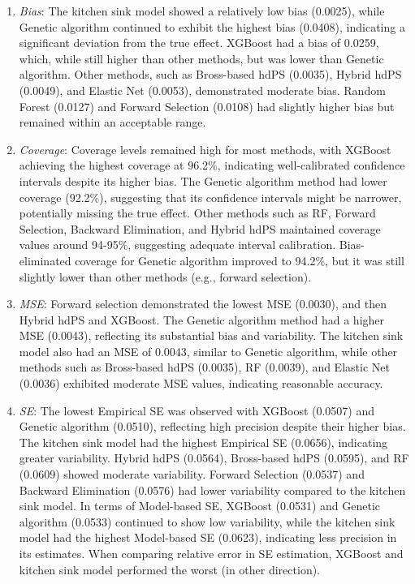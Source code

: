 \documentclass[10pt,letterpaper]{article}
\begin{document}
\begin{enumerate}
\def\labelenumi{\arabic{enumi}.}
\item
  \emph{Bias}: The kitchen sink model showed a relatively low bias
  (0.0025), while Genetic algorithm continued to exhibit the highest
  bias (0.0408), indicating a significant deviation from the true
  effect. XGBoost had a bias of 0.0259, which, while still higher than
  other methods, but was lower than Genetic algorithm. Other methods,
  such as Bross-based hdPS (0.0035), Hybrid hdPS (0.0049), and Elastic
  Net (0.0053), demonstrated moderate bias. Random Forest (0.0127) and
  Forward Selection (0.0108) had slightly higher bias but remained
  within an acceptable range.
\item
  \emph{Coverage}: Coverage levels remained high for most methods, with
  XGBoost achieving the highest coverage at 96.2\%, indicating
  well-calibrated confidence intervals despite its higher bias. The
  Genetic algorithm method had lower coverage (92.2\%), suggesting that
  its confidence intervals might be narrower, potentially missing the
  true effect. Other methods such as RF, Forward Selection, Backward
  Elimination, and Hybrid hdPS maintained coverage values around
  94-95\%, suggesting adequate interval calibration. Bias-eliminated
  coverage for Genetic algorithm improved to 94.2\%, but it was still
  slightly lower than other methods (e.g., forward selection).
\item
  \emph{MSE}: Forward selection demonstrated the lowest MSE (0.0030),
  and then Hybrid hdPS and XGBoost. The Genetic algorithm method had a
  higher MSE (0.0043), reflecting its substantial bias and variability.
  The kitchen sink model also had an MSE of 0.0043, similar to Genetic
  algorithm, while other methods such as Bross-based hdPS (0.0035), RF
  (0.0039), and Elastic Net (0.0036) exhibited moderate MSE values,
  indicating reasonable accuracy.
\item
  \emph{SE}: The lowest Empirical SE was observed with XGBoost (0.0507)
  and Genetic algorithm (0.0510), reflecting high precision despite
  their higher bias. The kitchen sink model had the highest Empirical SE
  (0.0656), indicating greater variability. Hybrid hdPS (0.0564),
  Bross-based hdPS (0.0595), and RF (0.0609) showed moderate
  variability. Forward Selection (0.0537) and Backward Elimination
  (0.0576) had lower variability compared to the kitchen sink model. In
  terms of Model-based SE, XGBoost (0.0531) and Genetic algorithm
  (0.0533) continued to show low variability, while the kitchen sink
  model had the highest Model-based SE (0.0623), indicating less
  precision in its estimates. When comparing relative error in SE
  estimation, XGBoost and kitchen sink model performed the worst (in
  other direction).
\end{enumerate}
\end{document}

